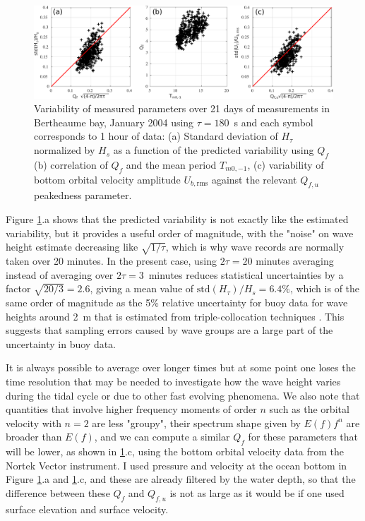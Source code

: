 {%
\begin{figure}[htb]
\centerline{\includegraphics[width=\textwidth]{FIGS_CH_GROUPS/Qf_test.pdf}}
  \caption{Variability of measured parameters over 21 days of measurements in Bertheaume bay, January 2004 using $\tau=180$~s and each symbol corresponds to 1 hour of data: (a) Standard deviation of $H_{\tau}$ normalized by $H_s$ as a function  of the predicted variability using $Q_f$ (b) correlation of $Q_f$ and the mean period $T_{m0,-1}$, (c) variability of bottom orbital velocity amplitude $U_{b,\mathrm{rms}}$ against the relevant $Q_{f,u}$ peakedness parameter.}
\label{fig:groupsQf}
\end{figure}
Figure \ref{fig:groupsQf}.a shows that the predicted variability is not exactly like the estimated variability, but it provides a useful order of magnitude, with the "noise" on wave height estimate decreasing like $\sqrt{1/\tau}$, which is why wave records are normally taken over 20 minutes. In the present case, using $2\tau = 20$ minutes averaging instead of averaging over $2\tau = 3$~minutes reduces statistical uncertainties by a factor $\sqrt{20/3}=2.6$, giving a mean value of $\mathrm{std}(H_\tau)/ H_s=6.4\%$, which is of the same order of magnitude as the 5\% relative uncertainty for buoy data for wave heights around 2~m  that is estimated from triple-collocation techniques \citep{Dodet&al.2022}. This suggests that sampling errors caused by wave groups are a large part of the uncertainty in buoy data.

It is always possible to average over longer times but at some point one loses the time resolution that may be needed to investigate how the wave height varies during the tidal cycle or due to other fast evolving phenomena. We also note that quantities that involve higher frequency moments of order $n$ such as the orbital velocity with $n=2$ are less "groupy", their spectrum shape given by $E(f)f^n$ are broader than $E(f)$,  and we can compute a similar $Q_f$ for these parameters that will be lower, as shown in  \ref{fig:groupsQf}.c, using the bottom orbital velocity data from the Nortek Vector instrument. I used pressure and velocity at the ocean bottom in Figure \ref{fig:groupsQf}.a and \ref{fig:groupsQf}.c, and these are already filtered by the water depth, so that the difference between these  $Q_f$  and  $Q_{f,u}$ is not as large as it would be if one used surface elevation and surface velocity.  


}
